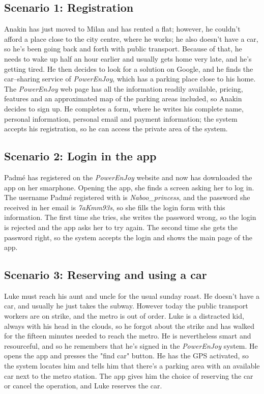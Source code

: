 \subsection{Scenario 1: Registration}
	Anakin has just moved to Milan and has rented a flat; however, he couldn't afford a place close to the city centre, where he works; he also doesn't have a car, so he's been going back and forth with public transport. Because of that, he needs to wake up half an hour earlier and usually gets home very late, and he's getting tired. He then decides to look for a solution on Google, and he finds the car–sharing service of \textit{PowerEnJoy}, which has a parking place close to his home. The \textit{PowerEnJoy} web page has all the information readily available, pricing, features and an approximated map of the parking areas included, so Anakin decides to sign up. He completes a form, where he writes his complete name, personal information, personal email and payment information; the system accepts his registration, so he can access the private area of the system. %
		
\subsection{Scenario 2: Login in the app}
	Padmé has registered on the \textit{PowerEnJoy} website and now has downloaded the app on her smarphone. Opening the app, she finds a screen asking her to log in. The username Padmé registered with is \textit{Naboo_princess}, and the password she received in her email is \textit{7aKmm93s}, so she fills the login form with this information. The first time she tries, she writes the password wrong, so the login is rejected and the app asks her to try again. The second time she gets the password right, so the system accepts the login and shows the main page of the app. 
	
\subsection{Scenario 3: Reserving and using a car}
	Luke must reach his aunt and uncle for the usual sunday roast. He doesn't have a car, and usually he just takes the subway. However today the public transport workers are on strike, and the metro is out of order. Luke is a distracted kid, always with his head in the clouds, so he forgot about the strike and has walked for the fifteen minutes needed to reach the metro. He is nevertheless smart and resourceful, and so he remembers that he's signed in the \textit{PowerEnJoy} system. He opens the app and presses the "find car" button. He has the GPS activated, so the system locates him and tells him that there's a parking area with an available car next to the metro station. The app gives him the choice of reserving the car or cancel the operation, and Luke reserves the car. 
	
